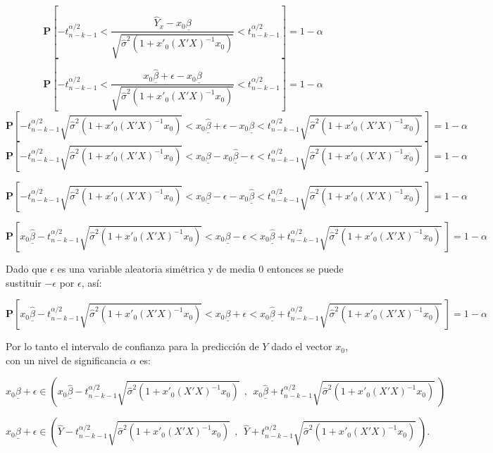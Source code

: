 \documentclass[
  a4paper,
  oneside,
  openany]{book}
\begin{document}
\[\mathbf{P}\left[-t^{\alpha/2}_{n-k-1}<\frac{\hat{Y}_{x}-x_{0}\underline{\beta}}{\sqrt{\hat{\sigma}^2\left(1+x'_{0}(X'X)^{-1}x_{0}\right)}}<t^{\alpha/2}_{n-k-1}\right]=1-\alpha\]
\[\mathbf{P}\left[-t^{\alpha/2}_{n-k-1}<\frac{x_{0}\underline{\hat{\beta}}+\epsilon-x_{0}\underline{\beta}}{\sqrt{\hat{\sigma}^2\left(1+x'_{0}(X'X)^{-1}x_{0}\right)}}<t^{\alpha/2}_{n-k-1}\right]=1-\alpha\]
\[\mathbf{P}\left[-t^{\alpha/2}_{n-k-1}\sqrt{\hat{\sigma}^2\left(1+x'_{0}(X'X)^{-1}x_{0}\right)}<x_{0}\underline{\hat{\beta}}+\epsilon-x_{0}\underline{\beta}<t^{\alpha/2}_{n-k-1}\sqrt{\hat{\sigma}^2\left(1+x'_{0}(X'X)^{-1}x_{0}\right)} \ \right]=1-\alpha\]
\[\mathbf{P}\left[-t^{\alpha/2}_{n-k-1}\sqrt{\hat{\sigma}^2\left(1+x'_{0}(X'X)^{-1}x_{0}\right)}<x_{0}\underline{\beta}-x_{0}\underline{\hat{\beta}}-\epsilon<t^{\alpha/2}_{n-k-1}\sqrt{\hat{\sigma}^2\left(1+x'_{0}(X'X)^{-1}x_{0}\right)} \ \right]=1-\alpha\]

\[\mathbf{P}\left[-t^{\alpha/2}_{n-k-1}\sqrt{\hat{\sigma}^2\left(1+x'_{0}(X'X)^{-1}x_{0}\right)}<x_{0}\underline{\beta}-\epsilon-x_{0}\underline{\hat{\beta}}<t^{\alpha/2}_{n-k-1}\sqrt{\hat{\sigma}^2\left(1+x'_{0}(X'X)^{-1}x_{0}\right)} \ \right]=1-\alpha\]

\[\mathbf{P}\left[x_{0}\underline{\hat{\beta}}-t^{\alpha/2}_{n-k-1}\sqrt{\hat{\sigma}^2\left(1+x'_{0}(X'X)^{-1}x_{0}\right)}<x_{0}\underline{\beta}-\epsilon<x_{0}\underline{\hat{\beta}}+t^{\alpha/2}_{n-k-1}\sqrt{\hat{\sigma}^2\left(1+x'_{0}(X'X)^{-1}x_{0}\right)} \ \right]=1-\alpha\]

Dado que \(\epsilon\) es una variable aleatoria simétrica y de media 0 entonces se puede sustituir \(-\epsilon\) por \(\epsilon\), así:

\[\mathbf{P}\left[x_{0}\underline{\hat{\beta}}-t^{\alpha/2}_{n-k-1}\sqrt{\hat{\sigma}^2\left(1+x'_{0}(X'X)^{-1}x_{0}\right)}<x_{0}\underline{\beta}+\epsilon<x_{0}\underline{\hat{\beta}}+t^{\alpha/2}_{n-k-1}\sqrt{\hat{\sigma}^2\left(1+x'_{0}(X'X)^{-1}x_{0}\right)} \ \right]=1-\alpha\]

Por lo tanto el intervalo de confianza para la predicción de \(Y\) dado el vector \(x_{0}\), con un nivel de significancia \(\alpha\) es:

\[x_{0}\underline{\beta}+\epsilon \in\left(x_{0}\underline{\hat{\beta}}-t^{\alpha/2}_{n-k-1}\sqrt{\hat{\sigma}^2\left(1+x'_{0}(X'X)^{-1}x_{0}\right)} \ \ , \ \ x_{0}\underline{\hat{\beta}}+t^{\alpha/2}_{n-k-1}\sqrt{\hat{\sigma}^2\left(1+x'_{0}(X'X)^{-1}x_{0}\right)} \ \right)\]

\[x_{0}\underline{\beta}+\epsilon \in \left(\hat{Y}-t^{\alpha/2}_{n-k-1}\sqrt{\hat{\sigma}^2\left(1+x'_{0}(X'X)^{-1}x_{0}\right)} \ \ , \ \ \hat{Y}+t^{\alpha/2}_{n-k-1}\sqrt{\hat{\sigma}^2\left(1+x'_{0}(X'X)^{-1}x_{0}\right)} \ \right).\]
\end{document}
